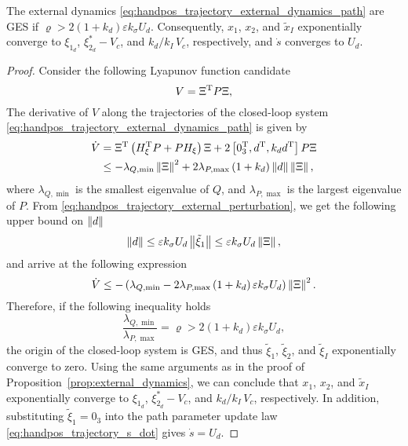 \begin{prop}
    \label{prop:external_dynamics_path}
    The external dynamics \eqref{eq:handpos_trajectory_external_dynamics_path} are GES if $\varrho > 2\left(1 + k_d\right)\varepsilon k_{\sigma} U_d$.
    Consequently, $x_1$, $x_2$, and $\tilde{x}_I$ exponentially converge to $\xi_{1_d}$, $\xi_{2_d}^{*} - V_c$, and $k_d/k_I\,V_c$, respectively, and $\dot{s}$ converges to $U_d$.
\end{prop}
\begin{proof}
    Consider the following Lyapunov function candidate
    \begin{equation}
        V = \Xi^{\mathrm{T}} P \Xi,
    \end{equation}
    The derivative of $V$ along the trajectories of the closed-loop system \eqref{eq:handpos_trajectory_external_dynamics_path} is given by
    \begin{equation}
    \begin{split}
        \dot{V} &= \Xi^{\mathrm{T}}\left(H_{\xi}^{\mathrm{T}} P + PH_{\xi}\right)\Xi + 2 \left[0_3^{\mathrm{T}}, d^{\mathrm{T}}, k_d d^{\mathrm{T}}\right] P \Xi \\
            &\leq -\lambda_{Q,\min}\left\|\Xi\right\|^2 + 2 \lambda_{P,\max}\left(1 + k_d\right)\left\|d\right\|\left\|\Xi\right\|,
    \end{split}
    \end{equation}
    where $\lambda_{Q,\min}$ is the smallest eigenvalue of $Q$, and $\lambda_{P,\max}$ is the largest eigenvalue of $P$.
    From \eqref{eq:handpos_trajectory_external_perturbation}, we get the following upper bound on $\left\|d\right\|$
    \begin{equation}
        \left\|d\right\| \leq \varepsilon k_{\sigma} U_d \left\|\tilde{\xi}_1\right\| \leq \varepsilon k_{\sigma} U_d \left\|\Xi\right\|,
    \end{equation}
    and arrive at the following expression
    \begin{equation}
        \dot{V} \leq - \left(\lambda_{Q,\min} - 2 \lambda_{P,\max}\left(1 + k_d\right)\varepsilon k_{\sigma} U_d\right) \left\|\Xi\right\|^2.
    \end{equation}
    Therefore, if the following inequality holds
    \begin{equation}
        \frac{\lambda_{Q,\min}}{\lambda_{P,\max}} = \varrho > 2\left(1 + k_d\right)\varepsilon k_{\sigma} U_d,
    \end{equation}
    the origin of the closed-loop system is GES, and thus $\tilde{\xi}_1$, $\tilde{\xi}_2$, and $\tilde{\xi}_I$ exponentially converge to zero.
    Using the same arguments as in the proof of Proposition~\ref{prop:external_dynamics}, we can conclude that $x_1$, $x_2$, and $\tilde{x}_I$ exponentially converge to $\xi_{1_d}$, $\xi_{2_d}^{*} - V_c$, and $k_d/k_I\,V_c$, respectively.
    In addition, substituting $\tilde{\xi}_1 = 0_3$ into the path parameter update law \eqref{eq:handpos_trajectory_s_dot} gives $\dot{s} = U_d$.
\end{proof}

